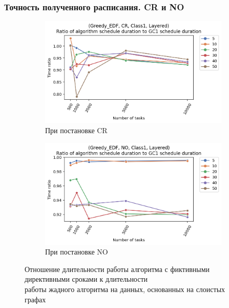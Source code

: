 \begin{frame}
    \frametitle{Точность полученного расписания. CR и NO}
    \begin{figure}
        \begin{subfigure}{0.49\textwidth}
            \includegraphics[width=\textwidth]{imgs/layered_class_1/CR_EDF/gr_amalgamated.png}
            \caption{При постановке CR}
        \end{subfigure}
        \begin{subfigure}{0.49\textwidth}
            \includegraphics[width=\textwidth]{imgs/layered_class_1/NO_EDF/gr_amalgamated.png}
            \caption{При постановке NO}
        \end{subfigure}
        \caption{Отношение длительности работы алгоритма с фиктивными директивными сроками к длительности\\работы жадного алгоритма на данных, основанных на слоистых графах}
    \end{figure}
\end{frame}

